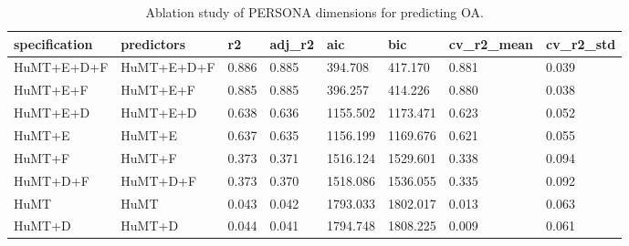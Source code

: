 \begin{table}[t]
\centering
\caption{Ablation study of PERSONA dimensions for predicting OA.}
\label{tab:ablation}
\begin{tabular}{llllllll}
\toprule
specification & predictors & r2 & adj\_r2 & aic & bic & cv\_r2\_mean & cv\_r2\_std \\
\midrule
HuMT+E+D+F & HuMT+E+D+F & 0.886 & 0.885 & 394.708 & 417.170 & 0.881 & 0.039 \\
HuMT+E+F & HuMT+E+F & 0.885 & 0.885 & 396.257 & 414.226 & 0.880 & 0.038 \\
HuMT+E+D & HuMT+E+D & 0.638 & 0.636 & 1155.502 & 1173.471 & 0.623 & 0.052 \\
HuMT+E & HuMT+E & 0.637 & 0.635 & 1156.199 & 1169.676 & 0.621 & 0.055 \\
HuMT+F & HuMT+F & 0.373 & 0.371 & 1516.124 & 1529.601 & 0.338 & 0.094 \\
HuMT+D+F & HuMT+D+F & 0.373 & 0.370 & 1518.086 & 1536.055 & 0.335 & 0.092 \\
HuMT & HuMT & 0.043 & 0.042 & 1793.033 & 1802.017 & 0.013 & 0.063 \\
HuMT+D & HuMT+D & 0.044 & 0.041 & 1794.748 & 1808.225 & 0.009 & 0.061 \\
\bottomrule
\end{tabular}
\end{table}
